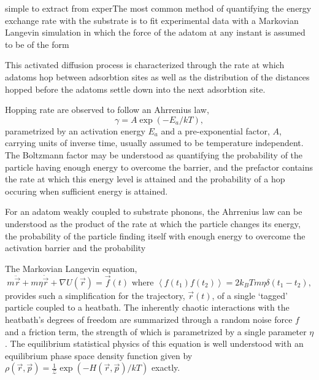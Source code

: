 \documentclass[7pt]{article}
\begin{document}
simple to extract from experThe most common method of quantifying the energy exchange rate with the substrate is to fit experimental data with a Markovian Langevin simulation in which the force of the adatom at any instant is assumed to be of the form 



This activated diffusion process is characterized through the rate at which adatoms hop between adsorbtion sites as well as the distribution of the distances hopped before the adatoms settle down into the next adsorbtion site. 

Hopping rate are observed to follow an Ahrrenius law\cite{someone}, $$\gamma=A\exp(-E_a/kT),$$ parametrized by an activation energy $E_a$ and a pre-exponential factor, $A$, carrying units of inverse time, usually assumed to be temperature independent. The Boltzmann factor may be understood as quantifying the probability of the particle having enough energy to overcome the barrier, and the prefactor contains the rate at which this energy level is attained and the probability of a hop occuring when sufficient energy is attained.



For an adatom weakly coupled to substrate phonons, the Ahrrenius law can be understood as the product of the rate at which the particle changes its energy, the probability of the particle finding itself with enough energy to overcome the activation barrier and the probability  

The Markovian Langevin equation, 
\begin{equation}
	m\ddot{\vec{r}}+m\eta\dot{\vec{r}}+\nabla U(\vec{r})=\vec{f}(t) \text{ where } \left<f(t_1)f(t_2)\right>=2k_BTm\eta\delta(t_1-t_2),
	\label{eq:langevin}
\end{equation}
provides such a simplification for the trajectory, $\vec{r}(t)$, of a single `tagged' particle coupled to a heatbath\cite{Kramers}. The inherently chaotic interactions with the heatbath's degrees of freedom are summarized through a random noise force $f$ and a friction term, the strength of which is parametrized by a single parameter $\eta$. The equilibrium statistical physics of this equation is well understood with an equilibrium phase space density function given by $\rho(\vec{r}, \vec{p})=\frac{1}{\mathcal{Z}}\exp\left(-H(\vec{r}, \vec{p})/kT\right)$ exactly\cite{Zwanzig}.
\end{document}
